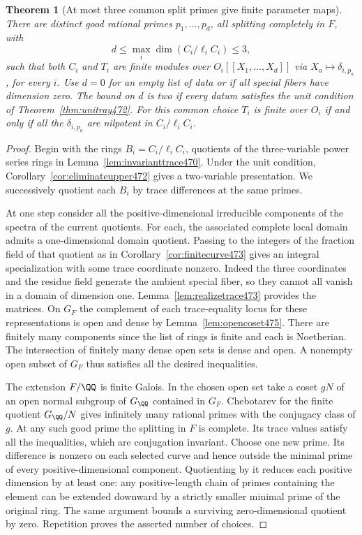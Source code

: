 \documentclass[a4paper,11pt]{article}
\newtheorem{theorem}[proposition]{Theorem}
\theoremstyle{definition}
\theoremstyle{remark}
\numberwithin{equation}{section}
\begin{document}
\begin{theorem}[At most three common split primes give finite parameter maps]\leavevmode
\label{thm:splitparameters475}
There are distinct good rational primes \(p_1,\ldots,p_d\), all
splitting completely in \(F\), with
\[
            d\le\max_i\dim(C_i/\ell_i C_i)\le3,
\]
such that both \(C_i\) and \(T_i\) are finite modules over
\(O_i[[X_1,\ldots,X_d]]\) via \(X_a\mapsto\delta_{i,p_a}\),
for every \(i\). Use \(d=0\) for an empty list of data or if all
special fibers have dimension zero. The bound on \(d\) is two
if every datum satisfies the unit condition of
Theorem~\ref{thm:unitray472}. For this common choice \(T_i\) is
finite over \(O_i\) if and only if all the \(\delta_{i,p_a}\)
are nilpotent in \(C_i/\ell_i C_i\).
\end{theorem}
\begin{proof}
Begin with the rings \(B_i=C_i/\ell_i C_i\), quotients of the
three-variable power series rings in Lemma~\ref{lem:invarianttrace470}.
Under the unit condition, Corollary~\ref{cor:eliminateupper472}
gives a two-variable presentation. We successively quotient each
\(B_i\) by trace differences at the same primes.

At one step consider all the positive-dimensional irreducible
components of the spectra of the current quotients. For each,
the associated complete local domain admits a one-dimensional
domain quotient. Passing to the integers of the fraction field
of that quotient as in Corollary~\ref{cor:finitecurve473} gives
an integral specialization with some trace coordinate nonzero.
Indeed the three coordinates and the residue field generate the
ambient special fiber, so they cannot all vanish in a domain of
dimension one. Lemma~\ref{lem:realizetrace473} provides the matrices.
On \(G_F\) the complement of each trace-equality locus for these
representations is open and dense by Lemma~\ref{lem:opencoset475}.
There are finitely many components since the list of rings is finite
and each is Noetherian. The intersection of finitely many dense
open sets is dense and open. A nonempty open subset of \(G_F\)
thus satisfies all the desired inequalities.

The extension \(F/\QQ\) is finite Galois. In the chosen open
set take a coset \(gN\) of an open normal subgroup of \(G_\QQ\)
contained in \(G_F\). Chebotarev for the finite quotient
\(G_\QQ/N\) gives infinitely many rational primes with the
conjugacy class of \(g\). At any such good prime the splitting
in \(F\) is complete. Its trace values satisfy all the inequalities,
which are conjugation invariant. Choose one new prime. Its
difference is nonzero on each selected curve and hence outside
the minimal prime of every positive-dimensional component.
Quotienting by it reduces each positive dimension by at least
one: any positive-length chain of primes containing the element
can be extended downward by a strictly smaller minimal prime
of the original ring. The same argument bounds a surviving
zero-dimensional quotient by zero. Repetition proves the asserted
number of choices.


\end{proof}
\end{document}
